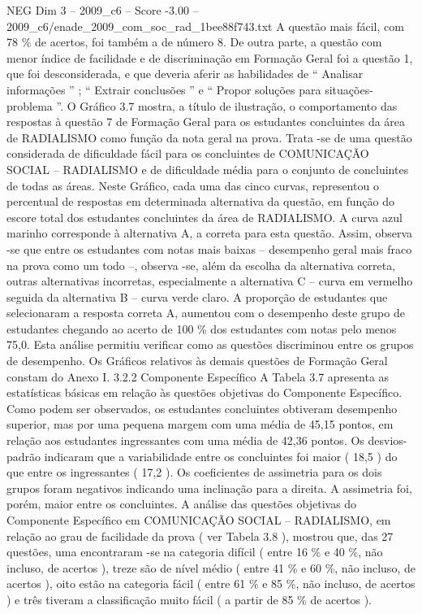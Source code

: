 \begin{textsample}{NEG Dim 3 – 2009\_c6 – Score -3.00 – 2009\_c6/enade\_2009\_com\_soc\_rad\_1bee88f743.txt}
A questão mais fácil, com 78 \% de acertos, foi também a de número 8.
De outra parte, a questão com menor índice de facilidade e de discriminação em Formação Geral foi a questão 1, que foi desconsiderada, e que deveria aferir as habilidades de “ Analisar informações ” ; “ Extrair conclusões ” e “ Propor soluções para situações-problema ”.
O Gráfico 3.7 mostra, a título de ilustração, o comportamento das respostas à questão 7 de Formação Geral para os estudantes concluintes da área de RADIALISMO como função da nota geral na prova.
Trata -se de uma questão considerada de dificuldade fácil para os concluintes de COMUNICAÇÃO SOCIAL – RADIALISMO e de dificuldade média para o conjunto de concluintes de todas as áreas.
Neste Gráfico, cada uma das cinco curvas, representou o percentual de respostas em determinada alternativa da questão, em função do escore total dos estudantes concluintes da área de RADIALISMO.
A curva azul marinho corresponde à alternativa A, a correta para esta questão.
Assim, observa -se que entre os estudantes com notas mais baixas – desempenho geral mais fraco na prova como um todo –, observa -se, além da escolha da alternativa correta, outras alternativas incorretas, especialmente a alternativa C – curva em vermelho seguida da alternativa B – curva verde claro.
A proporção de estudantes que selecionaram a resposta correta A, aumentou com o desempenho deste grupo de estudantes chegando ao acerto de 100 \% dos estudantes com notas pelo menos 75,0.
Esta análise permitiu verificar como as questões discriminou entre os grupos de desempenho.
Os Gráficos relativos às demais questões de Formação Geral constam do Anexo I. 3.2.2 Componente Específico A Tabela 3.7 apresenta as estatísticas básicas em relação às questões objetivas do Componente Específico.
Como podem ser observados, os estudantes concluintes obtiveram desempenho superior, mas por uma pequena margem com uma média de 45,15 pontos, em relação aos estudantes ingressantes com uma média de 42,36 pontos.
Os desvios-padrão indicaram que a variabilidade entre os concluintes foi maior ( 18,5 ) do que entre os ingressantes ( 17,2 ).
Os coeficientes de assimetria para os dois grupos foram negativos indicando uma inclinação para a direita.
A assimetria foi, porém, maior entre os concluintes.
A análise das questões objetivas do Componente Específico em COMUNICAÇÃO SOCIAL – RADIALISMO, em relação ao grau de facilidade da prova ( ver Tabela 3.8 ), mostrou que, das 27 questões, uma encontraram -se na categoria difícil ( entre 16 \% e 40 \%, não incluso, de acertos ), treze são de nível médio ( entre 41 \% e 60 \%, não incluso, de acertos ), oito estão na categoria fácil ( entre 61 \% e 85 \%, não incluso, de acertos ) e três tiveram a classificação muito fácil ( a partir de 85 \% de acertos ).

\end{textsample}
